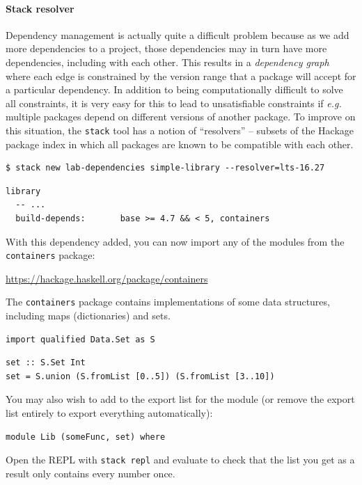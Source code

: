 \paragraph{Stack resolver} Dependency management is actually quite a difficult problem because as we add more dependencies to a project, those dependencies may in turn have more dependencies, including with each other. This results in a \emph{dependency graph} where each edge is constrained by the version range that a package will accept for a particular dependency. In addition to being computationally difficult to solve all constraints, it is very easy for this to lead to unsatisfiable constraints if \emph{e.g.} multiple packages depend on different versions of another package. To improve on this situation, the \texttt{\small stack} tool has a notion of ``resolvers'' -- subsets of the Hackage package index in which all packages are known to be compatible with each other.

\taskLine 

\begin{verbatim}
$ stack new lab-dependencies simple-library --resolver=lts-16.27
\end{verbatim}

\begin{verbatim}
library
  -- ...
  build-depends:       base >= 4.7 && < 5, containers
\end{verbatim}
With this dependency added, you can now import any of the modules from the \texttt{\small containers} package:
\begin{center}\small
	\url{https://hackage.haskell.org/package/containers}
\end{center}
The \texttt{\small containers} package contains implementations of some data structures, including maps (dictionaries) and sets.

\begin{verbatim}
import qualified Data.Set as S
\end{verbatim}

\begin{verbatim}
set :: S.Set Int 
set = S.union (S.fromList [0..5]) (S.fromList [3..10])
\end{verbatim}
You may also wish to add  to the export list for the module (or remove the export list entirely to export everything automatically):
\begin{verbatim}
module Lib (someFunc, set) where 
\end{verbatim}
Open the REPL with \texttt{\small stack repl} and evaluate  to check that the list you get as a result only contains every number once.